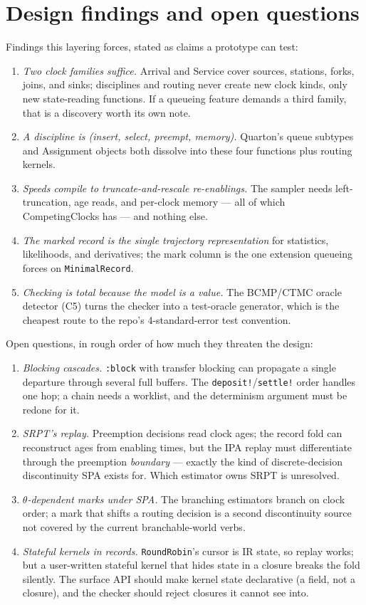 \documentclass[11pt]{article}
\newcommand{\code}[1]{\texttt{#1}}
\begin{document}
\section{Design findings and open questions}

Findings this layering forces, stated as claims a prototype can test:

\begin{enumerate}
\item \emph{Two clock families suffice.} Arrival and Service cover sources,
  stations, forks, joins, and sinks; disciplines and routing never create new
  clock kinds, only new state-reading functions. If a queueing feature
  demands a third family, that is a discovery worth its own note.
\item \emph{A discipline is (insert, select, preempt, memory).} Quarton's
  queue subtypes and Assignment objects both dissolve into these four
  functions plus routing kernels.
\item \emph{Speeds compile to truncate-and-rescale re-enablings.} The sampler
  needs left-truncation, age reads, and per-clock memory --- all of which
  CompetingClocks has --- and nothing else.
\item \emph{The marked record is the single trajectory representation} for
  statistics, likelihoods, and derivatives; the mark column is the one
  extension queueing forces on \code{MinimalRecord}.
\item \emph{Checking is total because the model is a value.} The BCMP/CTMC
  oracle detector (C5) turns the checker into a test-oracle generator, which
  is the cheapest route to the repo's 4-standard-error test convention.
\end{enumerate}

Open questions, in rough order of how much they threaten the design:

\begin{enumerate}
\item \emph{Blocking cascades.} \code{:block} with transfer blocking can
  propagate a single departure through several full buffers. The
  \code{deposit!}/\code{settle!} order handles one hop; a chain needs a
  worklist, and the determinism argument must be redone for it.
\item \emph{SRPT's replay.} Preemption decisions read clock ages; the record
  fold can reconstruct ages from enabling times, but the IPA replay must
  differentiate through the preemption \emph{boundary} --- exactly the kind of
  discrete-decision discontinuity SPA exists for. Which estimator owns SRPT
  is unresolved.
\item \emph{$\theta$-dependent marks under SPA.} The branching estimators
  branch on clock order; a mark that shifts a routing decision is a second
  discontinuity source not covered by the current branchable-world verbs.
\item \emph{Stateful kernels in records.} \code{RoundRobin}'s cursor is IR
  state, so replay works; but a user-written stateful kernel that hides state
  in a closure breaks the fold silently. The surface API should make kernel
  state declarative (a field, not a closure), and the checker should reject
  closures it cannot see into.
\end{enumerate}
\end{document}
